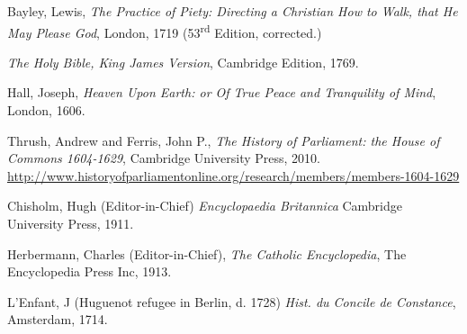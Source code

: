 \begin{thebibliography}{9}
        Bayley, Lewis,
        \textit{The Practice of Piety: Directing a Christian How to Walk, that He May Please God},
        London,
        1719 (53\textsuperscript{rd} Edition, corrected.)

        \textit{The Holy Bible, King James Version},
        Cambridge Edition,
        1769.

        Hall, Joseph,
        \textit{Heaven Upon Earth: or Of True Peace and Tranquility of Mind},
        London,
        1606.

        Thrush, Andrew and Ferris, John P.,
        \textit{The History of Parliament: the House of Commons 1604-1629},
        Cambridge University Press,
        2010.
        \url{http://www.historyofparliamentonline.org/research/members/members-1604-1629}

        Chisholm, Hugh (Editor-in-Chief)
        \textit{Encyclopaedia Britannica}
        Cambridge University Press,
        1911.

        Herbermann, Charles (Editor-in-Chief),
        \textit{The Catholic Encyclopedia},
        The Encyclopedia Press Inc,
        1913.
    
        L'Enfant, J (Huguenot refugee in Berlin, d. 1728)
        \textit{Hist. du Concile de Constance}, 
        Amsterdam, 
        1714.
        
\end{thebibliography}